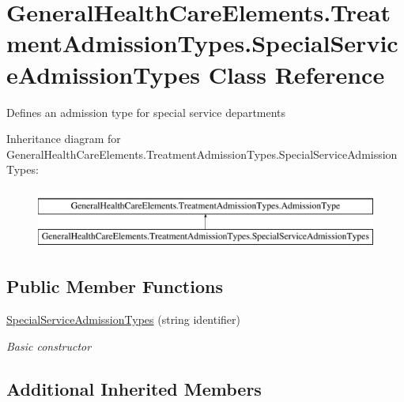\hypertarget{class_general_health_care_elements_1_1_treatment_admission_types_1_1_special_service_admission_types}{}\section{General\+Health\+Care\+Elements.\+Treatment\+Admission\+Types.\+Special\+Service\+Admission\+Types Class Reference}
\label{class_general_health_care_elements_1_1_treatment_admission_types_1_1_special_service_admission_types}


Defines an admission type for special service departments  


Inheritance diagram for General\+Health\+Care\+Elements.\+Treatment\+Admission\+Types.\+Special\+Service\+Admission\+Types\+:\begin{figure}[H]
\begin{center}
\leavevmode
\includegraphics[height=2.000000cm]{class_general_health_care_elements_1_1_treatment_admission_types_1_1_special_service_admission_types}
\end{center}
\end{figure}
\subsection*{Public Member Functions}
\begin{DoxyCompactItemize}
\item 
\hyperlink{class_general_health_care_elements_1_1_treatment_admission_types_1_1_special_service_admission_types_a086ebc2b283f1323b11acbd3d4a7f033}{Special\+Service\+Admission\+Types} (string identifier)
\begin{DoxyCompactList}\small\item\em Basic constructor \end{DoxyCompactList}\end{DoxyCompactItemize}
\subsection*{Additional Inherited Members}


